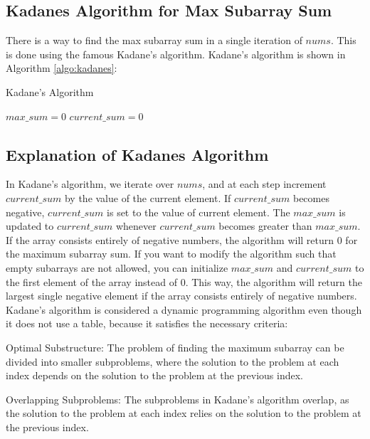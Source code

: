     
\subsection{Kadanes Algorithm for Max Subarray Sum}
    
There is a way to find the max subarray sum in a single iteration of $nums$.
This is done using the famous Kadane's algorithm.
Kadane's algorithm is shown in Algorithm \ref{algo:kadanes}: 

\begin{algorithm}[H]
    \caption{Kadane's Algorithm}
    \label{algo:kadanes}
    $max\_sum = 0$\;
    $current\_sum = 0$\;
\end{algorithm}
\subsection*{Explanation of Kadanes Algorithm}
In Kadane's algorithm, we iterate over $nums$, and at each step increment $current\_sum$ by the value of the current element. 
If $current\_sum$ becomes negative, $current\_sum$ is set to the value of current element. 
The $max\_sum$ is updated to $current\_sum$ whenever $current\_sum$ becomes greater than $max\_sum$.
If the array consists entirely of negative numbers, the algorithm will return 0 for the maximum subarray sum.
If you want to modify the algorithm such that empty subarrays are not allowed, you can initialize $max\_sum$ and $current\_sum$ to the first element of the array instead of 0.
This way, the algorithm will return the largest single negative element if the array consists entirely of negative numbers.
Kadane's algorithm is considered a dynamic programming algorithm even though it does not use a table, because it satisfies the necessary criteria:

Optimal Substructure: The problem of finding the maximum subarray can be divided into smaller subproblems, where the solution to the problem at each index depends on the solution to the problem at the previous index.

Overlapping Subproblems: The subproblems in Kadane's algorithm overlap, as the solution to the problem at each index relies on the solution to the problem at the previous index.

